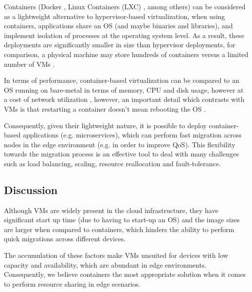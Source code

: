Containers (Docker \cite{docker}, Linux Containers (LXC) \cite{lxc}, among others) can be considered as a lightweight alternative to hypervisor-based virtualization, when using containers, applications share an OS (and maybe binaries and libraries), and implement isolation of processes at the operating system level. As a result, these deployments are significantly smaller in size than hypervisor deployments, for comparison, a physical machine may store hundreds of containers versus a limited number of VMs \cite{7036275}.  

In terms of performance, container-based virtualization can be compared to an OS running on bare-metal in terms of memory, CPU and disk usage, however at a cost of network utilization \cite{preeth2015evaluation}, however, an important detail which contrasts with VMs is that restarting a container doesn't mean rebooting the OS \cite{7036275}.

Consequently, given their lightweight nature, it is possible to deploy container-based applications (e.g. microservices), which can perform fast migration across nodes in the edge environment (e.g. in order to improve QoS). This flexibility towards the migration process is an effective tool to deal with many challenges such as load balancing, scaling, resource reallocation and fault-tolerance. 

\subsection{Discussion}

Although VMs are widely present in the cloud infrastructure, they have significant start up time (due to having to start-up an OS) and the image sizes are larger when compared to containers, which hinders the ability to perform quick migrations across different devices. 

The accumulation of these factors make VMs unsuited for devices with low capacity and availability, which are abundant in edge environments. Consequently, we believe containers the most appropriate solution when it comes to perform resource sharing in edge scenarios. 